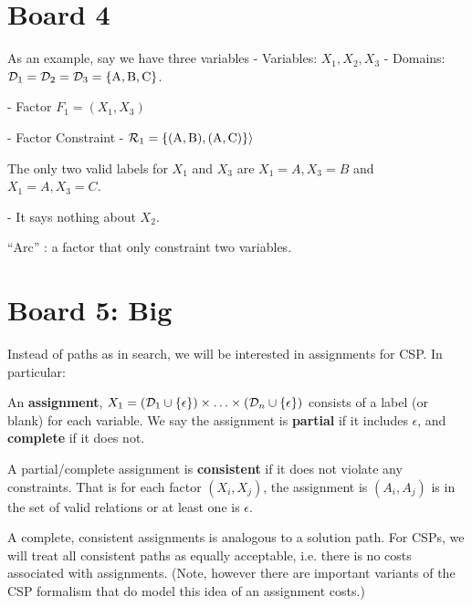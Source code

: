 \documentclass[10pt]{article}
\begin{document}
\section{Board 4}
As an example, say we have three variables 
- Variables: $X_1, X_2, X_3$
- Domains: $\mathcal{D}_1 = \mathcal{D}_2 = \mathcal{D}_3 = \{\mathrm{A, B, C}\}$. 

- Factor $F_1 = (X_1, X_3)$

- Factor Constraint - $\mathcal{R}_1 = \{(\mathrm{A, B}), \mathrm{(A, C})\} \rangle $

The
only two valid labels for $X_1$ and $X_3$ are $X_1 = A, X_3 = B$ and
$X_1 = A, X_3=C$. 

- It says nothing about $X_2$.  

``Arc'' : a factor that only constraint two variables.


\section{Board 5: Big}

Instead of paths as in search, we will be interested in assignments for CSP. In particular:  

\begin{defn}
An \textbf{assignment}, $X_1 = (\mathcal{D}_1 \cup \{\epsilon\}) \times \ldots \times (\mathcal{D}_n \cup \{\epsilon\})$ consists of a label (or blank) for each variable. We say the assignment is \textbf{partial} if it includes $\epsilon$, and \textbf{complete} if it does not. 
\end{defn}


\begin{defn}
  A partial/complete assignment is \textbf{consistent} if it
  does not violate any constraints. That is for each factor $(X_i, X_j)$,
  the assignment is $(A_i, A_j)$ is in the set of valid relations or
  at least one is $\epsilon$.
\end{defn}

A complete, consistent assignments is analogous to a solution path.
For CSPs, we will treat all consistent paths as equally acceptable,
i.e. there is no costs associated with assignments. (Note, however
there are important variants of the CSP formalism that do model this
idea of an assignment costs.)
\end{document}

